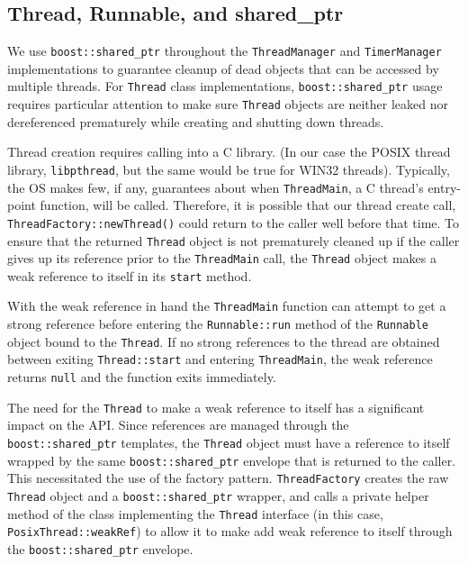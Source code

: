\documentclass[nocopyrightspace,blockstyle]{sigplanconf}
\begin{document}
\subsection{Thread, Runnable, and shared\_ptr}
We use \texttt{boost::shared\_ptr} throughout the \texttt{ThreadManager} and
\texttt{TimerManager} implementations to guarantee cleanup of dead objects that can
be accessed by multiple threads. For \texttt{Thread} class implementations,
\texttt{boost::shared\_ptr} usage requires particular attention to make sure
\texttt{Thread} objects are neither leaked nor dereferenced prematurely while
creating and shutting down threads.

Thread creation requires calling into a C library. (In our case the POSIX
thread library, \texttt{libpthread}, but the same would be true for WIN32 threads).
Typically, the OS makes few, if any, guarantees about when \texttt{ThreadMain}, a C thread's entry-point function, will be called. Therefore, it is
possible that our thread create call,
\texttt{ThreadFactory::newThread()} could return to the caller
well before that time. To ensure that the returned \texttt{Thread} object is not
prematurely cleaned up if the caller gives up its reference prior to the
\texttt{ThreadMain} call, the \texttt{Thread} object makes a weak reference to
itself in its \texttt{start} method.

With the weak reference in hand the \texttt{ThreadMain} function can attempt to get
a strong reference before entering the \texttt{Runnable::run} method of the
\texttt{Runnable} object bound to the \texttt{Thread}. If no strong references to the
thread are obtained between exiting \texttt{Thread::start} and entering \texttt{ThreadMain}, the weak reference returns \texttt{null} and the function
exits immediately.

The need for the \texttt{Thread} to make a weak reference to itself has a
significant impact on the API. Since references are managed through the
\texttt{boost::shared\_ptr} templates, the \texttt{Thread} object must have a reference
to itself wrapped by the same \texttt{boost::shared\_ptr} envelope that is returned
to the caller. This necessitated the use of the factory pattern.
\texttt{ThreadFactory} creates the raw \texttt{Thread} object and a
\texttt{boost::shared\_ptr} wrapper, and calls a private helper method of the class
implementing the \texttt{Thread} interface (in this case, \texttt{PosixThread::weakRef})
 to allow it to make add weak reference to itself through the
 \texttt{boost::shared\_ptr} envelope.
\end{document}
